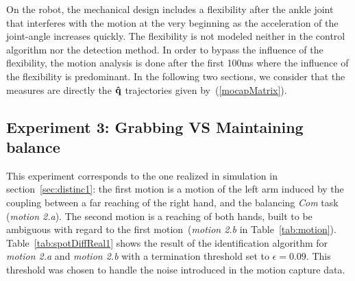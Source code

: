 \documentclass[journal]{IEEEtran}
\begin{document}
On the robot, the mechanical design includes a flexibility after the ankle joint that
interferes with the motion at the very beginning as the acceleration
of the joint-angle increases quickly. The flexibility is not modeled
neither in the control algorithm nor the detection method.
In order to bypass the influence of the flexibility, the motion analysis is done after the first 100ms
where the influence of the flexibility is predominant.
In the following two sections, we consider that the measures are directly the ${\mathbf{\hat{q}}}$ trajectories
given by~(\ref{mocapMatrix}).

\subsection{Experiment 3: Grabbing VS Maintaining balance}
This experiment corresponds to the one realized in simulation in section~\ref{sec:distinc1}:
the first motion is a motion of the left arm induced by the coupling between a far reaching of the right hand,
and the balancing \emph{Com} task (\emph{motion 2.a}). The second motion is a reaching of both hands, built to be
ambiguous with regard to the first motion~(\emph{motion 2.b} in Table~\ref{tab:motion}).
Table~\ref{tab:spotDiffReal1} shows the result of the identification algorithm for
\emph{motion 2.a} and \emph{motion 2.b} with a termination threshold set to $ \epsilon = 0.09$.
This threshold was chosen to handle the noise introduced in the motion capture data.
\end{document}
